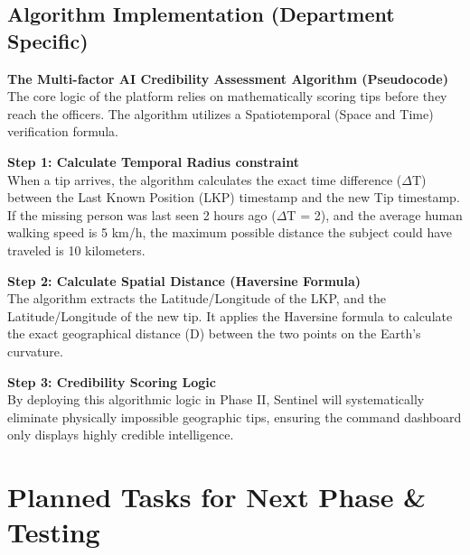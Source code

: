 \documentclass[12pt,a4paper]{report}
\begin{document}
\section{Algorithm Implementation (Department Specific)}
\textbf{The Multi-factor AI Credibility Assessment Algorithm (Pseudocode)} \\
The core logic of the platform relies on mathematically scoring tips before they reach the officers. The algorithm utilizes a Spatiotemporal (Space and Time) verification formula.

\textbf{Step 1: Calculate Temporal Radius constraint} \\
When a tip arrives, the algorithm calculates the exact time difference ($\Delta$T) between the Last Known Position (LKP) timestamp and the new Tip timestamp. If the missing person was last seen 2 hours ago ($\Delta$T = 2), and the average human walking speed is 5 km/h, the maximum possible distance the subject could have traveled is 10 kilometers.

\textbf{Step 2: Calculate Spatial Distance (Haversine Formula)} \\
The algorithm extracts the Latitude/Longitude of the LKP, and the Latitude/Longitude of the new tip. It applies the Haversine formula to calculate the exact geographical distance (D) between the two points on the Earth's curvature.

\textbf{Step 3: Credibility Scoring Logic} \\
By deploying this algorithmic logic in Phase II, Sentinel will systematically eliminate physically impossible geographic tips, ensuring the command dashboard only displays highly credible intelligence.


\chapter{Planned Tasks for Next Phase \& Testing}
\end{document}
